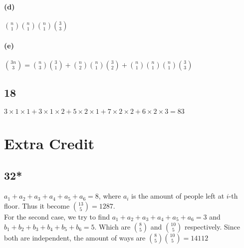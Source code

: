 \documentclass[letter]{article}
\begin{document}
\paragraph*{(d)}
${n\choose 1}{n \choose 1}{n \choose 1}{3 \choose 3}$
\paragraph*{(e)}
${3n \choose 3} = {n \choose 3}{3 \choose 1}+{n \choose 2}{n \choose 1}{3
\choose 2}+{n\choose 1}{n \choose 1}{n \choose 1}{3 \choose 3}$

\subsection*{18}
$3 \times 1 \times 1+ 3\times 1 \times 2 + 5 \times 2 \times 1 + 7\times 2
\times 2 + 6\times 2 \times 3 = 83$

\section*{Extra Credit}
\subsection*{32*}
$a_1+a_2+a_3+a_4+a_5+a_6 = 8$, where $a_i$ is the amount of people left at
$i$-th floor. Thus it
become ${13 \choose 5} = 1287$.\\
For the second case, we try to find $a_1+a_2+a_3+a_4+a_5+a_6 = 3$ and
$b_1+b_2+b_3+b_4+b_5+b_6 = 5$. Which are ${8 \choose 5}$ and ${10 \choose 5}$
respectively. Since both are independent, the amount of ways are ${8 \choose
5}{10 \choose 5} = 14112$
\end{document}
